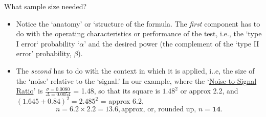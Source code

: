 \documentclass{beamer}\usepackage[]{graphicx}\usepackage[]{color}
\begin{document}
\begin{frame}{What sample size needed?}
\begin{itemize}
	\item Notice the `anatomy' or `structure of the formula. The \textit{first} component has to do
	with the operating characteristics or performance of the test, i.e.,
	the `type I error` probability `$\alpha$' 
	and the desired power (the complement of the `type II error' probability, $\beta$).
	
	\item The \textit{second} has to do
	with the context in which it is applied, i..e, the size of the `noise' relative to the  `signal.'
	In our example, where the `\underline{Noise-to-Signal Ratio}' is $\frac{\sigma = 0.0080}{\Delta = 0.0054}$ = 1.48,
	so that its square is $1.48^2$ or approx 2.2,
	and $(1.645 + 0.84)^2 = 2.485^2$ = approx 6.2,
	$$  n = 6.2  \times 2.2  =  13.6, \textrm{approx, or, rounded up,  } n = \textbf{14}. $$
\end{itemize}
\end{frame}
\end{document}

